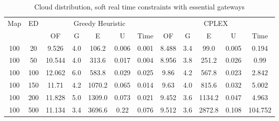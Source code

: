 \begin{table}[htb]
	\centering
	\begin{tabular}{|c|c|c|c|c|c|c|c|c|c|c|c|}
		\hline
		\multirow{2}{*}{Map} & \multirow{2}{*}{ED} & \multicolumn{5}{c|}{Greedy Heuristic} & \multicolumn{5}{c|}{CPLEX}\\ 
		\cline{3-12}
&& OF & G & E & U & Time & OF & G & E & U & Time\\ 
		\hline
		100 & 20 & 9.526 & 4.0 & 106.2 & 0.006 & 0.001 & 8.488 & 3.4 & 99.0 & 0.005 & 0.194 \\ 
		100 & 50 & 10.544 & 4.0 & 313.6 & 0.017 & 0.004 & 8.956 & 3.8 & 251.2 & 0.026 & 0.99 \\ 
		100 & 100 & 12.062 & 6.0 & 583.8 & 0.029 & 0.025 & 9.86 & 4.2 & 567.8 & 0.023 & 2.842 \\ 
		100 & 150 & 11.71 & 4.2 & 1070.2 & 0.065 & 0.014 & 9.63 & 4.0 & 815.6 & 0.032 & 5.002 \\ 
		100 & 200 & 11.828 & 5.0 & 1309.0 & 0.073 & 0.021 & 9.452 & 3.6 & 1134.2 & 0.047 & 4.963 \\ 
		100 & 500 & 11.134 & 3.4 & 3696.6 & 0.22 & 0.076 & 9.512 & 3.6 & 2872.8 & 0.108 & 104.752 \\ 
		\hline 
	\end{tabular} 
	\caption{Cloud distribution, soft real time constraints with essential gateways} 
	\label{tab:cloud_soft_esc} 
\end{table} 

